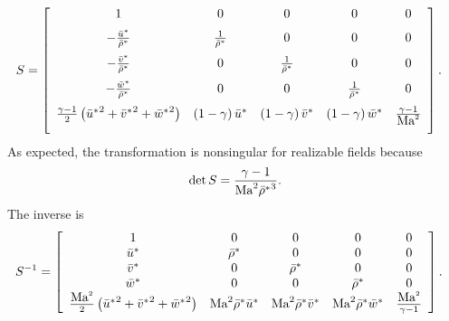 \begin{align}
S &= \left[\begin{array}{ccccc}
    1      %
  & 0      %
  & 0      %
  & 0      %
  & 0      %
  \\ \noalign{\medskip}
    - \frac{\bar{u}^*}{\bar{\rho}^*} %
  & \frac{1}{\bar{\rho}^*}           %
  & 0                                %
  & 0                                %
  & 0                                %
  \\ \noalign{\medskip}
    - \frac{\bar{v}^*}{\bar{\rho}^*} %
  & 0                                %
  & \frac{1}{\bar{\rho}^*}           %
  & 0                                %
  & 0                                %
  \\ \noalign{\medskip}
    - \frac{\bar{w}^*}{\bar{\rho}^*} %
  & 0                                %
  & 0                                %
  & \frac{1}{\bar{\rho}^*}           %
  & 0                                %
  \\ \noalign{\medskip}
    \frac{\gamma-1}{2}\left({\bar{u}^*}^2+{\bar{v}^*}^2+{\bar{w}^*}^2\right) %
  & \left(1 - \gamma\right) \bar{u}^*   %
  & \left(1 - \gamma\right) \bar{v}^*   %
  & \left(1 - \gamma\right) \bar{w}^*   %
  & \frac{\gamma-1}{\Mach^2}            %
  \\ \noalign{\medskip}
\end{array}\right].
\end{align}
As expected, the transformation is nonsingular for realizable fields because
\[
  \det S = \frac{\gamma-1}{\mbox{Ma}_{}^2 {\bar{\rho}^{*}}^3}.
\]
The inverse is
\begin{align}
S^{-1} &= \left[\begin{array}{ccccc}
  1                                                                       & 0                              & 0                              & 0                              & 0                        \\
  \bar{u}^{*}                                                             & \bar{\rho}^*                   & 0                              & 0                              & 0                        \\
  \bar{v}^{*}                                                             & 0                              & \bar{\rho}^*                   & 0                              & 0                        \\
  \bar{w}^{*}                                                             & 0                              & 0                              & \bar{\rho}^*                   & 0                        \\
  \frac{\mbox{Ma}_{}^2}{2}\left({\bar{u}^*}^2+{\bar{v}^*}^2+{\bar{w}^*}^2\right) & \mbox{Ma}_{}^2 \bar{\rho}^* \bar{u}^* & \mbox{Ma}_{}^2 \bar{\rho}^* \bar{v}^* & \mbox{Ma}_{}^2 \bar{\rho}^* \bar{w}^* & \frac{\mbox{Ma}_{}^2}{\gamma-1}
\end{array}\right].
\end{align}
